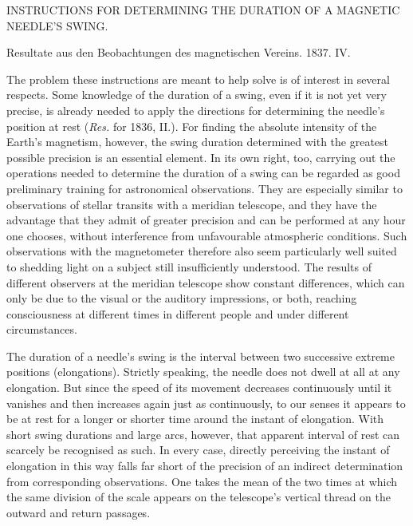 \clearpage
{}
\begin{center}
{\large INSTRUCTIONS FOR DETERMINING THE DURATION OF A MAGNETIC NEEDLE’S SWING.}
\par\medskip
Resultate aus den Beobachtungen des magnetischen Vereins. 1837. IV.
\end{center}

The problem these instructions are meant to help solve is of interest in several respects. Some knowledge of the duration of a swing, even if it is not yet very precise, is already needed to apply the directions for determining the needle’s position at rest (\textit{Res.} for 1836, II.). For finding the absolute intensity of the Earth’s magnetism, however, the swing duration determined with the greatest possible precision is an essential element. In its own right, too, carrying out the operations needed to determine the duration of a swing can be regarded as good preliminary training for astronomical observations. They are especially similar to observations of stellar transits with a meridian telescope, and they have the advantage that they admit of greater precision and can be performed at any hour one chooses, without interference from unfavourable atmospheric conditions. Such observations with the magnetometer therefore also seem particularly well suited to shedding light on a subject still insufficiently understood. The results of different observers at the meridian telescope show constant differences, which can only be due to the visual or the auditory impressions, or both, reaching consciousness at different times in different people and under different circumstances.

The duration of a needle’s swing is the interval between two successive extreme positions (elongations). Strictly speaking, the needle does not dwell at all at any elongation. But since the speed of its movement decreases continuously until it vanishes and then increases again just as continuously, to our senses it appears to be at rest for a longer or shorter time around the instant of elongation. With short swing durations and large arcs, however, that apparent interval of rest can scarcely be recognised as such. In every case, directly perceiving the instant of elongation in this way falls far short of the precision of an indirect determination from corresponding observations. One takes the mean of the two times at which the same division of the scale appears on the telescope’s vertical thread on the outward and return passages.

